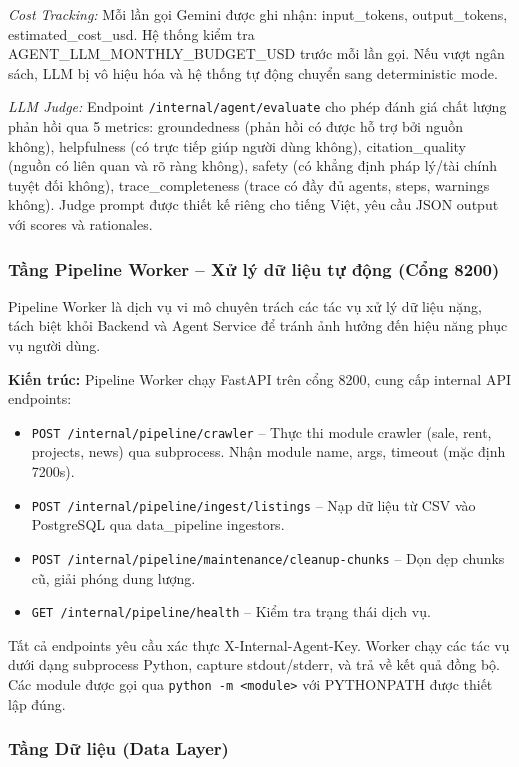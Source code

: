 \textit{Cost Tracking:} Mỗi lần gọi Gemini được ghi nhận: input\_tokens, output\_tokens, estimated\_cost\_usd. Hệ thống kiểm tra AGENT\_LLM\_MONTHLY\_BUDGET\_USD trước mỗi lần gọi. Nếu vượt ngân sách, LLM bị vô hiệu hóa và hệ thống tự động chuyển sang deterministic mode.

\textit{LLM Judge:} Endpoint \texttt{/internal/agent/evaluate} cho phép đánh giá chất lượng phản hồi qua 5 metrics: groundedness (phản hồi có được hỗ trợ bởi nguồn không), helpfulness (có trực tiếp giúp người dùng không), citation\_quality (nguồn có liên quan và rõ ràng không), safety (có khẳng định pháp lý/tài chính tuyệt đối không), trace\_completeness (trace có đầy đủ agents, steps, warnings không). Judge prompt được thiết kế riêng cho tiếng Việt, yêu cầu JSON output với scores và rationales.

\subsubsection{Tầng Pipeline Worker -- Xử lý dữ liệu tự động (Cổng 8200)}

Pipeline Worker là dịch vụ vi mô chuyên trách các tác vụ xử lý dữ liệu nặng, tách biệt khỏi Backend và Agent Service để tránh ảnh hưởng đến hiệu năng phục vụ người dùng.

\textbf{Kiến trúc:} Pipeline Worker chạy FastAPI trên cổng 8200, cung cấp internal API endpoints:

\begin{itemize}
    \item \texttt{POST /internal/pipeline/crawler} -- Thực thi module crawler (sale, rent, projects, news) qua subprocess. Nhận module name, args, timeout (mặc định 7200s).
    \item \texttt{POST /internal/pipeline/ingest/listings} -- Nạp dữ liệu từ CSV vào PostgreSQL qua data\_pipeline ingestors.
    \item \texttt{POST /internal/pipeline/maintenance/cleanup-chunks} -- Dọn dẹp chunks cũ, giải phóng dung lượng.
    \item \texttt{GET /internal/pipeline/health} -- Kiểm tra trạng thái dịch vụ.
\end{itemize}

Tất cả endpoints yêu cầu xác thực X-Internal-Agent-Key. Worker chạy các tác vụ dưới dạng subprocess Python, capture stdout/stderr, và trả về kết quả đồng bộ. Các module được gọi qua \texttt{python -m <module>} với PYTHONPATH được thiết lập đúng.

\subsubsection{Tầng Dữ liệu (Data Layer)}

